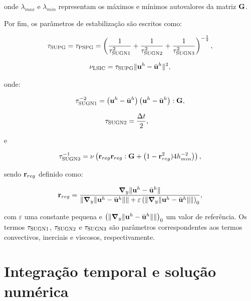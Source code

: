 \noindent onde $\lambda_{max}$ e $\lambda_{min}$ representam os máximos e mínimos autovalores da matriz $\mathbf{G}$. 

Por fim, os parâmetros de estabilização são escritos como:

\begin{align}
	\tau_{\mathrm{SUPG}} = \tau_{\mathrm{PSPG}} =\left(\frac{1}{\tau_{\mathrm{SUGN1}}^2} + \frac{1}{\tau_{\mathrm{SUGN2}}^2} + \frac{1}{\tau_{\mathrm{SUGN3}}^2} \right)^{-\frac{1}{2}},
\end{align}

\begin{align}
	\nu_{\mathrm{LSIC}} = \tau_{\mathrm{SUPG}} \lVert\mathbf{u}^h - \bar{\mathbf{u}}^h\rVert^2,
\end{align}

\noindent onde:

\begin{align}
	\tau_{\mathrm{SUGN1}}^{-2} = \left(\mathbf{u}^h - \bar{\mathbf{u}}^h \right) \left(\mathbf{u}^h - \bar{\mathbf{u}}^h \right) : \mathbf{G} ,
\end{align}

\begin{align}
	\tau_{\mathrm{SUGN2}}&=\frac{\Delta t}{2},
\end{align}

\noindent e

\begin{align}
	\tau_{\mathrm{SUGN3}}^{-1} = \nu \left(\mathbf{r}_{reg}\mathbf{r}_{reg} : \mathbf{G} + \left(1 - \mathbf{r}_{reg}^2)4h_{min}^{-2} \right)\right) ,
\end{align}

\noindent sendo $\mathbf{r}_{reg}$ definido como:

\begin{align}
	\mathbf{r}_{reg} =\frac{\boldsymbol{\nabla}_y \lVert\mathbf{u}^h - \bar{\mathbf{u}}^h\rVert}{\lVert \boldsymbol{\nabla}_y \lVert\mathbf{u}^h - \bar{\mathbf{u}}^h\rVert\rVert + \varepsilon\left(\lVert \boldsymbol{\nabla}_y \lVert\mathbf{u}^h - \bar{\mathbf{u}}^h\rVert\rVert\right)_0},
\end{align}

\noindent com $\varepsilon$ uma constante pequena e $\left(\lVert \boldsymbol{\nabla}_y \lVert\mathbf{u}^h- \bar{\mathbf{u}}^h\rVert\rVert\right)_0$ um valor de referência. Os termos $\tau_{\mathrm{SUGN1}}$, $\tau_{\mathrm{SUGN2}}$ e $\tau_{\mathrm{SUGN3}}$ são parâmetros correspondentes aos termos convectivos, inerciais e viscosos, respectivamente.

\section{Integração temporal e solução numérica}\label{capitulo:Cap2:IntegTemp}

